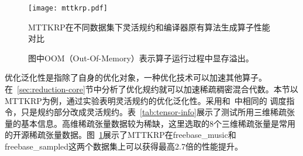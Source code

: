 \begin{figure}[H]%
  \centering
  \texttt{[image: mttkrp.pdf]}
  \caption{MTTKRP在不同数据集下灵活规约和编译器原有算法生成算子性能对比}
  \caption*{图中OOM（Out-Of-Memory）表示算子运行过程中显存溢出。}
  \label{fig:comp-mttkrp}
\end{figure}

优化泛化性是指除了自身的优化对象，一种优化技术可以加速其他算子。在~\ref{sec:reduction-core}节中分析了优化规约就可以加速稀疏稠密混合代数。本节以MTTKRP为例，通过实验表明灵活规约的优化泛化性。采用和~\cite{senanayake:2020:scheduling}中相同的
调度指令，只是规约部分改成灵活规约。表~\ref{tab:tensor-info}展示了测试所用三维稀疏张量的基本信息。高维稀疏张量数据较为稀缺，这里选取的8个三维稀疏张量是常用的开源稀疏张量数据。图~\ref{fig:comp-mttkrp}展示了MTTKRP在freebase\_music和freebase\_sampled这两个数据集上可以获得最高2.7倍的性能提升。